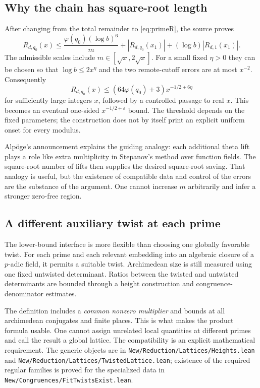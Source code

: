\documentclass[11pt,letterpaper]{article}
\theoremstyle{definition}\newtheorem{definition}[theorem]{Definition}
\theoremstyle{remark}\newtheorem{remark}[theorem]{Remark}
\newcommand{\src}[1]{\nolinkurl{#1}}
\begin{document}
\subsection{Why the chain has square-root length}
After changing from the total remainder to \eqref{eq:primeR}, the source proves
\begin{equation}\label{eq:cutoffs}
 R_{d,q_0}(x)\le
 \frac{\varphi(q_0)(\log b)^6}{m}
 +|R_{d,q_0}(x_1)|+(\log b)|R_{d,1}(x_1)|.
\end{equation}
The admissible scales include $m\in[\sqrt{x},2\sqrt{x}]$. For a small fixed $\eta>0$ they can
be chosen so that $\log b\le2x^\eta$ and the two remote-cutoff errors are at most $x^{-2}$.
Consequently
\[
 R_{d,q_0}(x)\le(64\varphi(q_0)+3)x^{-1/2+6\eta}
\]
for sufficiently large integers $x$, followed by a controlled passage to real $x$.
This becomes an eventual one-sided $x^{-1/2+\varepsilon}$ bound.
The threshold depends on the fixed parameters; the construction does not by itself print
an explicit uniform onset for every modulus.\cite{onesided}

Alp\"oge's announcement explains the guiding analogy: each additional theta lift plays a role
like extra multiplicity in Stepanov's method over function fields. The square-root number
of lifts then supplies the desired square-root saving. That analogy is useful, but the
existence of compatible data and control of the errors are the substance of the argument.
One cannot increase $m$ arbitrarily and infer a stronger zero-free region.\cite{announcement}

\subsection{A different auxiliary twist at each prime}
The lower-bound interface is more flexible than choosing one globally favorable twist.
For each prime and each relevant embedding into an algebraic closure of a $p$-adic field,
it permits a suitable twist. Archimedean size is still measured using one fixed untwisted
determinant. Ratios between the twisted and untwisted determinants are bounded through
a height construction and congruence-denominator estimates.

The definition  includes a \emph{common nonzero multiplier} and bounds at all
archimedean conjugates and finite places. This is what makes the product formula usable.
One cannot assign unrelated local quantities at different primes and call the result a
global lattice. The compatibility is an explicit mathematical requirement. The generic
objects are in \src{New/Reduction/Lattices/Heights.lean} and
\src{New/Reduction/Lattices/TwistedLattice.lean}; existence of the required regular families
is proved for the specialized data in \src{New/Congruences/FitTwistsExist.lean}.
\cite{heights,twisted,regulartwists}
\end{document}
